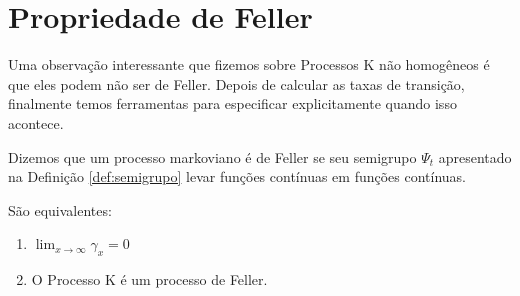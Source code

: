 
\section{Propriedade de Feller}
\label{sec:prop-feller}


Uma observação interessante que fizemos sobre Processos K não
homogêneos é que eles podem não ser de Feller.  Depois de calcular as
taxas de transição, finalmente temos ferramentas para especificar
explicitamente quando isso acontece.

Dizemos que um processo markoviano é de Feller se seu semigrupo
$\Psi_t$ apresentado na Definição \ref{def:semigrupo} levar funções
contínuas em funções contínuas.

\begin{proposicao}
  São equivalentes:
  \begin{enumerate}
  \item $\displaystyle \lim_{x \to \infty} \gamma_x = 0$
  \item O Processo K é um processo de Feller.
  \end{enumerate}
\end{proposicao}

